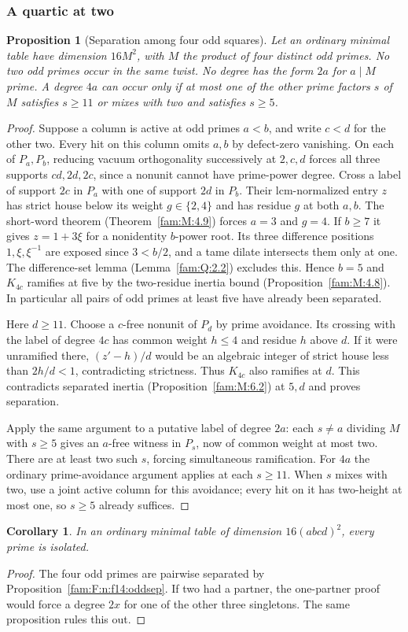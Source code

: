 \documentclass[11pt,a4paper]{article}
\numberwithin{equation}{section}
\newtheorem{proposition}[theorem]{Proposition}
\newtheorem{corollary}[theorem]{Corollary}
\theoremstyle{remark}
\begin{document}
\subsubsection{A quartic at two}\label{fam:F:sec:5.2}
\begin{proposition}[Separation among four odd squares]\label{fam:F:5.7}\label{fam:F:n:f14:oddsep}
Let an ordinary minimal table have dimension $16M^2$, with $M$ the
product of four distinct odd primes. No two odd primes occur in the same
twist. No degree has the form $2a$ for $a\mid M$ prime. A degree $4a$
can occur only if at most one of the other prime factors $s$ of $M$
satisfies $s\ge11$ or mixes with two and satisfies $s\ge5$.
\end{proposition}
\begin{proof}
Suppose a column is active at odd primes $a<b$, and write $c<d$ for
the other two. Every hit on this column omits $a,b$ by defect-zero
vanishing. On each of $P_a,P_b$, reducing vacuum orthogonality successively
at $2,c,d$ forces all three supports $cd,2d,2c$, since a nonunit
cannot have prime-power degree. Cross a label of support $2c$ in $P_a$
with one of support $2d$ in $P_b$. Their lcm-normalized entry $z$ has
strict house below its weight $g\in\{2,4\}$ and has residue $g$ at both
$a,b$. The short-word theorem (Theorem~\ref{fam:M:4.9}) forces $a=3$
and $g=4$. If $b\ge7$ it gives $z=1+3\xi$ for a nonidentity
$b$-power root. Its three difference positions $1,\xi,\xi^{-1}$ are
exposed since $3<b/2$, and a tame dilate intersects them only at one.
The difference-set lemma (Lemma~\ref{fam:Q:2.2}) excludes this.
Hence $b=5$ and $K_{4c}$ ramifies at five by the two-residue inertia
bound (Proposition~\ref{fam:M:4.8}). In particular all pairs of odd
primes at least five have already been separated.

Here $d\ge11$. Choose a $c$-free nonunit of $P_d$ by prime
avoidance. Its crossing with the label of degree $4c$ has
common weight $h\le4$ and residue $h$ above $d$. If it were unramified
there, $(z'-h)/d$ would be an algebraic integer of strict house
less than $2h/d<1$, contradicting strictness. Thus $K_{4c}$ also
ramifies at $d$. This contradicts separated inertia
(Proposition~\ref{fam:M:6.2}) at $5,d$ and proves separation.

Apply the same argument to a putative label of degree $2a$: each
$s\ne a$ dividing $M$ with $s\ge5$ gives an $a$-free witness in
$P_s$, now of common weight at most two. There are at least two such
$s$, forcing simultaneous ramification. For $4a$ the ordinary
prime-avoidance argument applies at each $s\ge11$. When $s$ mixes
with two, use a joint active column for this avoidance; every hit on it
has two-height at most one, so $s\ge5$ already suffices.
\end{proof}
\begin{corollary}\label{fam:F:5.8}
In an ordinary minimal table of dimension $16(abcd)^2$, every prime is isolated.
\end{corollary}
\begin{proof}
The four odd primes are pairwise separated by Proposition~\ref{fam:F:n:f14:oddsep}. If two had a partner, the one-partner proof would force a degree $2x$ for one of the other three singletons. The same proposition rules this out.
\end{proof}
\end{document}
